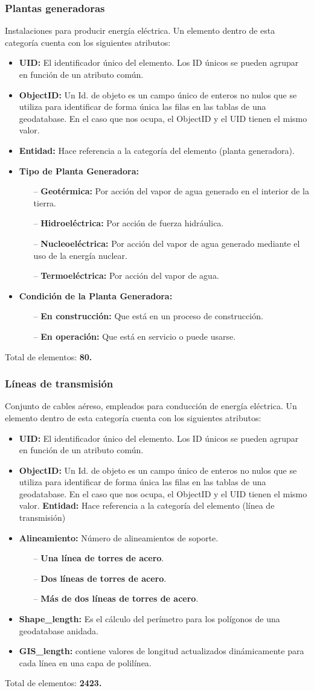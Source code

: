 \documentclass[10pt,letterpaper]{article}
\newcommand{\descripcion}{Un elemento dentro de esta categor\'ia cuenta con los siguientes atributos:}
\newcommand{\total}{Total de elementos: }
\newcommand{\UID}{\textbf{UID:} El identificador \'unico del elemento. Los ID \'unicos se pueden agrupar en funci\'on de un atributo com\'un.}
\newcommand{\OID}{\textbf{ObjectID:} Un Id. de objeto es un campo \'unico de enteros no nulos que se utiliza para identificar de forma \'unica las filas en las tablas de una geodatabase. En el caso que nos ocupa, el ObjectID y el UID tienen el mismo valor.}
\newcommand{\ent}{\textbf{Entidad:} Hace referencia a la categor\'ia del elemento }
\newcommand{\SHL}{\textbf{Shape\_length:} Es el c\'alculo del per\'imetro para los pol\'igonos de una geodatabase anidada.}
\newcommand{\GISL}{\textbf{GIS\_length:} contiene valores de longitud actualizados din\'amicamente para cada l\'inea en una capa de polil\'inea.}
\begin{document}
\subsubsection{Plantas generadoras}
Instalaciones para producir energ\'ia el\'ectrica. \descripcion
\begin{itemize}
	\item \UID
	\item \OID
	\item \ent (planta generadora).
	\item \textbf{Tipo de Planta Generadora:} 
	\begin{itemize}
		\item[--] \textbf{Geot\'ermica:} Por acci\'on del vapor de agua generado en el interior de la tierra.
		\item[--] \textbf{Hidroel\'ectrica:} Por acci\'on de fuerza hidr\'aulica.
		\item[--] \textbf{Nucleoel\'ectrica:} Por acci\'on del vapor de agua generado mediante el uso de la energ\'ia nuclear.
		\item[--] \textbf{Termoel\'ectrica:} Por acci\'on del vapor de agua.
	\end{itemize}
	\item \textbf{Condici\'on de la Planta Generadora:}
	\begin{itemize}
		\item[--] \textbf{En construcci\'on:} Que est\'a en un proceso de construcci\'on.
		\item[--] \textbf{En operaci\'on:} Que est\'a en servicio o puede usarse.
	\end{itemize}
\end{itemize}
\total \textbf{80.}

\subsubsection{L\'ineas de transmisi\'on}
Conjunto de cables a\'ereso, empleados para conducci\'on de energ\'ia el\'ectrica. \descripcion
\begin{itemize}
	\item \UID
	\item \OID
	\ent (l\'inea de transmisi\'on)
	\item \textbf{Alineamiento:} N\'umero de alineamientos de soporte.
	\begin{itemize}
		\item[--] \textbf{Una l\'inea de torres de acero}.
		\item[--] \textbf{Dos l\'ineas de torres de acero}.
		\item[--] \textbf{M\'as de dos l\'ineas de torres de acero}.
	\end{itemize}
	\item \SHL
	\item \GISL
\end{itemize}
\total \textbf{2423.}
\end{document}
